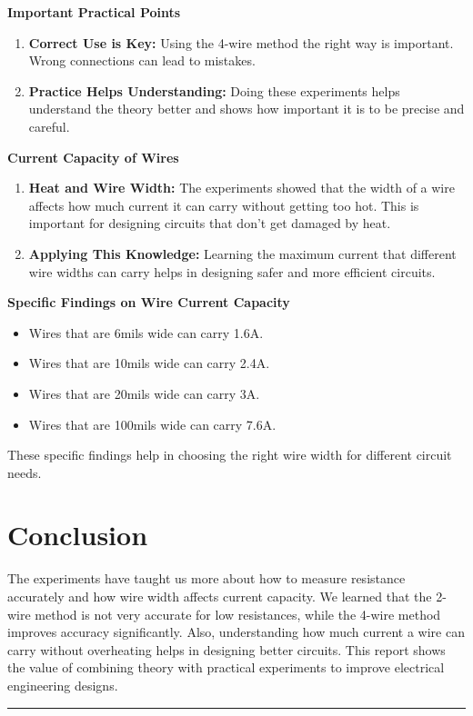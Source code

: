\documentclass[a4paper,11pt]{article}%
\begin{document}
\textbf{Important Practical Points}
\begin{enumerate}
	\item \textbf{Correct Use is Key:} Using the 4-wire method the right way is important. Wrong connections can lead to mistakes.
	\item 
	\textbf{Practice Helps Understanding:} Doing these experiments helps understand the theory better and shows how important it is to be precise and careful.
\end{enumerate}
	


\textbf{Current Capacity of Wires}
\begin{enumerate}
	\item \textbf{Heat and Wire Width:} The experiments showed that the width of a wire affects how much current it can carry without getting too hot. This is important for designing circuits that don't get damaged by heat.
	\item \textbf{Applying This Knowledge:} Learning the maximum current that different wire widths can carry helps in designing safer and more efficient circuits.
\end{enumerate}


\textbf{Specific Findings on Wire Current Capacity}
\begin{itemize}
	\item Wires that are 6mils wide can carry 1.6A.
	\item Wires that are 10mils wide can carry 2.4A.
	\item Wires that are 20mils wide can carry 3A.
	\item Wires that are 100mils wide can carry 7.6A.
\end{itemize}

These specific findings help in choosing the right wire width for different circuit needs.

\section{Conclusion}

The experiments have taught us more about how to measure resistance accurately and how wire width affects current capacity. We learned that the 2-wire method is not very accurate for low resistances, while the 4-wire method improves accuracy significantly. Also, understanding how much current a wire can carry without overheating helps in designing better circuits. This report shows the value of combining theory with practical experiments to improve electrical engineering designs.\\[10cm]


\hrule






\end{document}
